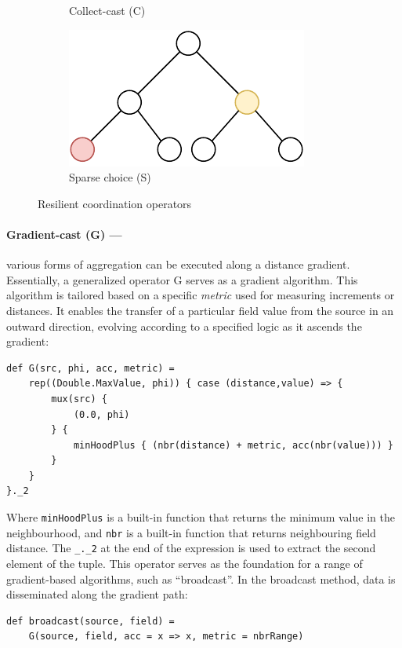 \begin{figure}
\begin{subfigure}{0.3\textwidth}
        \caption{Collect-cast (C)}\label{fig:collect-cast}
    \end{subfigure}
    \begin{subfigure}{0.3\textwidth}
        \centering
        \includegraphics[width=\textwidth]{chapters/img/s.drawio.pdf}
        \caption{Sparse choice (S)}\label{fig:sparse-choice}
    \end{subfigure}
    \caption{Resilient coordination operators}\label{fig:resilient-coordination-operators}
\end{figure}
\paragraph*{Gradient-cast (G) --- }
various forms of aggregation 
 can be executed along a distance gradient.
 Essentially, a generalized operator G serves as a gradient algorithm. 
 This algorithm is tailored based on a specific \emph{metric} used for measuring increments or distances. 
 It enables the transfer of a particular field value from the source in an outward direction, 
 evolving according to a specified logic as it ascends the gradient:
\begin{lstlisting}
def G(src, phi, acc, metric) =
    rep((Double.MaxValue, phi)) { case (distance,value) => {
        mux(src) {
            (0.0, phi)
        } {
            minHoodPlus { (nbr(distance) + metric, acc(nbr(value))) }
        }
    }
}._2
\end{lstlisting}
Where \texttt{minHoodPlus} is a built-in function that returns the minimum value in the neighbourhood, 
 and \texttt{nbr} is a built-in function that returns neighbouring field distance.
 The \lstinline|_._2| at the end of the expression is used to extract the second element of the tuple.
This operator serves as the foundation for a range of gradient-based algorithms, 
 such as ``broadcast''. 
 In the broadcast method, data is disseminated along the gradient path:
\begin{lstlisting}
def broadcast(source, field) =
    G(source, field, acc = x => x, metric = nbrRange)
\end{lstlisting}
